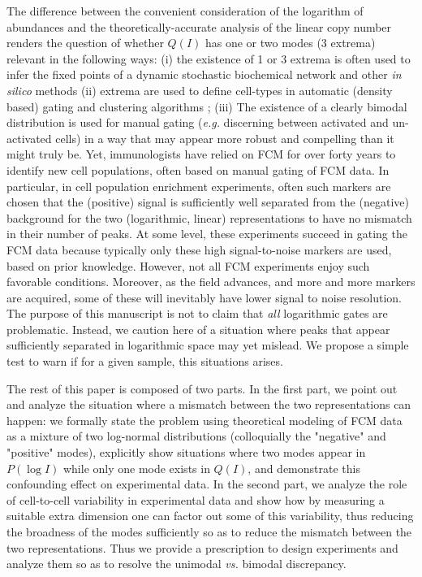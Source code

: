 \documentclass[11pt,a4paper,final]{article}
\begin{document}
The difference between the convenient consideration of the logarithm of abundances and the theoretically-accurate analysis of the linear copy number renders the question of whether $Q(I)$ has one or two modes (3 extrema) relevant in the following ways: (i) the existence of 1 or 3 extrema is often used to infer the fixed points of a dynamic stochastic biochemical network \cite{Friedman2006,Pal2015,Vogel2016} and other \emph{in silico} methods \cite{Das2009} (ii) extrema are used to define cell-types in automatic (density based) gating and clustering algorithms \cite{Cron2013,ONeill2013,Anchang2014,Finak2014,Saeys2016,Chen2016}; (iii) The existence of a clearly bimodal distribution is used for manual gating ({\it e.g.} discerning between activated and un-activated cells) in a way that may appear more robust and compelling than it might truly be. Yet, immunologists have relied on FCM for over forty years to identify new cell populations, often based on manual gating of FCM data. In particular, in cell population enrichment experiments, often such markers are chosen that the (positive) signal is sufficiently well separated from the (negative) background for the two (logarithmic, linear) representations to have no mismatch in their number of peaks. At some level, these experiments succeed in gating the FCM data because typically only these high signal-to-noise markers are used, based on prior knowledge. However, not all FCM experiments enjoy such favorable conditions. Moreover, as the field advances, and more and more markers are acquired, some of these will inevitably have lower signal to noise resolution. The purpose of this manuscript is not to claim that \emph{all} logarithmic gates are problematic. Instead, we caution here of a situation where peaks that appear sufficiently separated in logarithmic space may yet mislead. We propose a simple test to warn if for a given sample, this situations arises.

\smallskip
The rest of this paper is composed of two parts. In the first part, we point out and analyze the situation where a mismatch between the two representations can happen: we formally state the problem using theoretical modeling of FCM data as a mixture of two log-normal distributions (colloquially the "negative" and "positive" modes), explicitly show situations where two modes appear in $P(\log I)$ while only one mode exists in $Q(I)$, and demonstrate this confounding effect on experimental data. In the second part, we analyze the role of cell-to-cell variability in experimental data and show how by measuring a suitable extra dimension one can factor out some of this variability, thus reducing the broadness of the modes sufficiently so as to reduce the mismatch between the two representations. Thus we provide a prescription to design experiments and analyze them so as to resolve the unimodal {\it vs.} bimodal discrepancy. 
\end{document}

